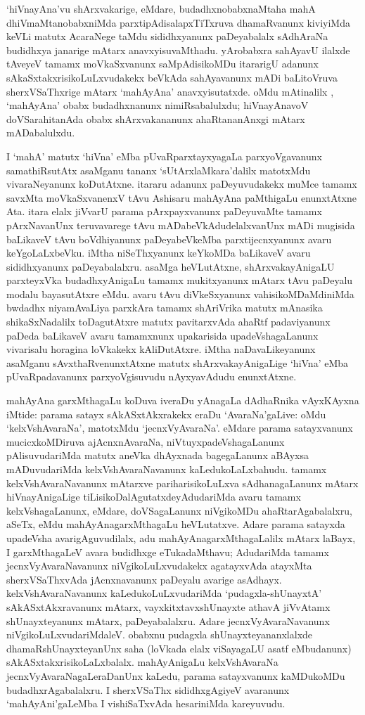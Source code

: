 `hiVnayAna'vu shArxvakarige, eMdare, budadhxnobabxnaMtaha mahA dhiVmaMta\-nobabxniMda parxtipAdisalapxTiTxruva dhamaRvanunx kiviyiMda keVLi matutx AcaraNege taMdu sididhxyanunx paDeyabalalx sAdhAraNa budidhxya janarige mAtarx anavxyisuvaMthadu. yArobabxra sahAyavU ilalxde tAveyeV tamamx moVkaSxvanunx saMpAdisikoMDu itararigU adanunx sAkaSxtakxrisikoLuLxvudakekx beVkAda sahAyavanunx mADi baLitoVruva sherxVSaThxrige mAtarx `mahAyAna' anavxyisutatxde. oMdu mAtinalilx , `mahAyAna' obabx budadhxnanunx nimiRsabalulxdu; hiVnayAnavoV doVSarahitanAda obabx shArxvakananunx ahaRtananAnxgi mAtarx mADabalulxdu.

I `mahA' matutx `hiVna' eMba pUvaRparxtayxyagaLa parxyoVgavanunx samathiRsutAtx asaMganu tananx `sUtArxlaMkara'dalilx matotxMdu vivaraNeyanunx koDutAtxne. itararu adanunx paDeyuvudakekx muMce tamamx savxMta moVkaSxvanenxV tAvu Ashisaru mahAyAna paMthigaLu enunxtAtxne Ata. itara elalx jiVvarU parama pArxpayxvanunx paDeyuvaMte tamamx pArxNavanUnx teruvavarege tAvu mADabeVkAdudelalxvanUnx mADi mugisida baLikaveV tAvu boVdhiyanunx paDeyabeVkeMba parxtijecnxyanunx avaru keYgoLaLxbeVku. iMtha niSeThxyanunx keYkoMDa baLikaveV avaru sididhxyanunx paDeyabalalxru. asaMga heVLutAtxne, shArxvakayAnigaLU parxteyxVka budadhxyAnigaLu tamamx
mukitxyanunx mAtarx tAvu paDeyalu modalu bayasutAtxre eMdu. avaru tAvu diVkeSxyanunx vahisikoMDaMdiniMda bwdadhx niyamAvaLiya parxkAra tamamx shAriVrika matutx mAnasika shikaSxNadalilx toDagutAtxre matutx pavitarxvAda ahaRtf padaviyanunx paDeda baLikaveV avaru tamamxnunx upakarisida upadeVshagaLanunx vivarisalu horagina loVkakekx kAliDutAtxre. iMtha naDavaLikeyanunx asaMganu sAvxthaRvenunxtAtxne matutx shArxvakayAnigaLige `hiVna' eMba pUvaRpadavanunx parxyoVgisuvudu nAyxyavAdudu enunxtAtxne.

mahAyAna garxMthagaLu koDuva iveraDu yAnagaLa dAdhaRnika vAyxKAyxna iMtide: parama satayx sAkASxtAkxrakekx eraDu `AvaraNa'gaLive: oMdu `kelxVshAvaraNa', matotxMdu `jecnxVyAvaraNa'. eMdare parama satayxvanunx mucicxkoMDiruva ajAcnxnA\-varaNa, niVtuyxpadeVshagaLanunx pAlisuvudariMda matutx aneVka dhAyxnada bagegaLanunx aBAyxsa mADuvudariMda kelxVshAvaraNa\-vanunx kaLedukoLaLxbahudu. tamamx kelxVshAvaraNa\-vanunx mAtarxve pariharisikoLuLxva sAdhanagaLanunx mAtarx hiVnayAnigaLige tiLisi\-koDa\-lAgutatxdeyAdudariMda avaru tamamx kelxVshagaLanunx, eMdare, doVSagaLanunx niVgikoMDu ahaRtarAgabalalxru, aSeTx, eMdu mahAyAnagarxMthagaLu heVLutatxve. Adare parama satayxda upadeVsha avarigAguvudilalx, adu mahAyAnagarxMthagaLalilx mAtarx laBayx, I garxMthagaLeV avara budidhxge eTukadaMthavu; AdudariMda tamamx jecnxVyAvaraNavanunx niVgi\-koLuLxvudakekx agatayxvAda atayxMta sherxVSaThxvAda jAcnxnavanunx paDeyalu avarige asAdhayx. kelxVshAvaraNavanunx kaLedukoLuLxvudariMda `pudagxla-shUnayxtA' sAkASxtAkxravanunx mAtarx, vayxkitxtavxshUnayxte athavA jiVvAtamx shUnayxteyanunx mAtarx, paDeyabalalxru. Adare jecnxVyA\-varaNavanunx niVgikoLuLxvudariMdaleV. obabxnu pudagxla shUnayxteyananxlalxde dhamaR\-shUnayxte\-yanUnx saha (loVkada elalx viSayagaLU asatf eMbudanunx) sAkASxtakxrisikoLaLxbalalx. mahAyAnigaLu kelxVshAvaraNa jecnxVyAvaraNagaLeraDanUnx kaLedu, parama satayxvanunx kaMDu\-koMDu budadhx\-rAgabalalxru. I sherxVSaThx sididhxgAgiyeV avaranunx `mahAyAni'gaLeMba I vishiSaTxvAda hesariniMda kareyuvudu.

